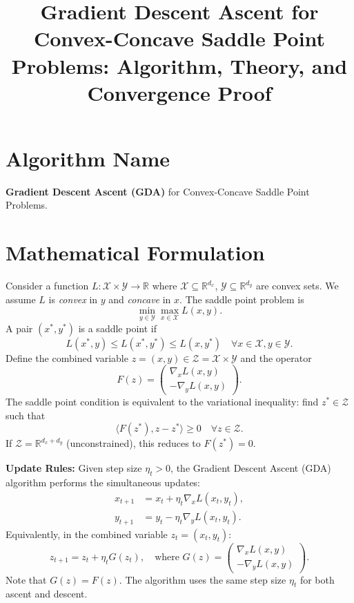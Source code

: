 \documentclass{article}
\title{Gradient Descent Ascent for Convex-Concave Saddle Point Problems: Algorithm, Theory, and Convergence Proof}
\author{}
\date{}
\begin{document}
\maketitle

\section*{Algorithm Name}
\textbf{Gradient Descent Ascent (GDA)} for Convex-Concave Saddle Point Problems.

\section*{Mathematical Formulation}
Consider a function $L: \mathcal{X} \times \mathcal{Y} \to \mathbb{R}$ where $\mathcal{X} \subseteq \mathbb{R}^{d_x}$, $\mathcal{Y} \subseteq \mathbb{R}^{d_y}$ are convex sets. We assume $L$ is \textit{convex} in $y$ and \textit{concave} in $x$. The saddle point problem is
\[
\min_{y \in \mathcal{Y}} \max_{x \in \mathcal{X}} L(x,y).
\]
A pair $(x^*, y^*)$ is a saddle point if
\[
L(x^*, y) \le L(x^*, y^*) \le L(x, y^*) \quad \forall x \in \mathcal{X}, y \in \mathcal{Y}.
\]
Define the combined variable $z = (x, y) \in \mathcal{Z} = \mathcal{X} \times \mathcal{Y}$ and the operator
\[
F(z) = \begin{pmatrix} \nabla_x L(x,y) \\ -\nabla_y L(x,y) \end{pmatrix}.
\]
The saddle point condition is equivalent to the variational inequality: find $z^* \in \mathcal{Z}$ such that
\[
\langle F(z^*), z - z^* \rangle \ge 0 \quad \forall z \in \mathcal{Z}.
\]
If $\mathcal{Z} = \mathbb{R}^{d_x+d_y}$ (unconstrained), this reduces to $F(z^*) = 0$.

\textbf{Update Rules:} Given step size $\eta_t > 0$, the Gradient Descent Ascent (GDA) algorithm performs the simultaneous updates:
\begin{align}
x_{t+1} &= x_t + \eta_t \nabla_x L(x_t, y_t), \label{eq:gda_x} \\
y_{t+1} &= y_t - \eta_t \nabla_y L(x_t, y_t). \label{eq:gda_y}
\end{align}
Equivalently, in the combined variable $z_t = (x_t, y_t)$:
\[
z_{t+1} = z_t + \eta_t G(z_t), \quad \text{where } G(z) = \begin{pmatrix} \nabla_x L(x,y) \\ -\nabla_y L(x,y) \end{pmatrix}.
\]
Note that $G(z) = F(z)$. The algorithm uses the same step size $\eta_t$ for both ascent and descent.
\end{document}
